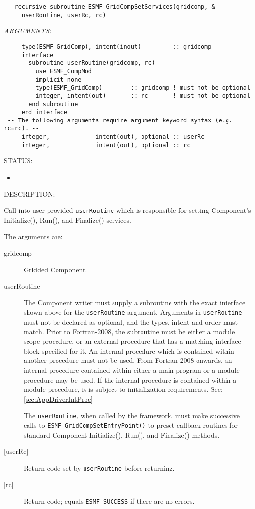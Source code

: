   
\begin{verbatim}   recursive subroutine ESMF_GridCompSetServices(gridcomp, &
     userRoutine, userRc, rc)\end{verbatim}{\em ARGUMENTS:}
\begin{verbatim}     type(ESMF_GridComp), intent(inout)         :: gridcomp
     interface
       subroutine userRoutine(gridcomp, rc)
         use ESMF_CompMod
         implicit none
         type(ESMF_GridComp)        :: gridcomp ! must not be optional
         integer, intent(out)       :: rc       ! must not be optional
       end subroutine
     end interface
 -- The following arguments require argument keyword syntax (e.g. rc=rc). --
     integer,             intent(out), optional :: userRc
     integer,             intent(out), optional :: rc\end{verbatim}
{\sf STATUS:}
   \begin{itemize}
   \item{}
   \end{itemize}
  
{\sf DESCRIPTION:\\ }


   \label{GridComp:SetServices}
   Call into user provided {\tt userRoutine} which is responsible for
   setting Component's Initialize(), Run(), and Finalize() services.
  
   The arguments are:
   \begin{description}
   \item[gridcomp]
     Gridded Component.
   \item[userRoutine]
     The Component writer must supply a subroutine with the exact interface
     shown above for the {\tt userRoutine} argument. Arguments in {\tt userRoutine}
     must not be declared as optional, and the types, intent and order must match.
     Prior to Fortran-2008, the subroutine must be either a module scope procedure,
     or an external procedure that has a matching interface block specified for it.
     An internal procedure which is contained within another procedure must not be used.
     From Fortran-2008 onwards, an internal procedure contained within either a main program
     or a module procedure may be used.  If the internal procedure is contained within a
     module procedure, it is subject to initialization requirements.  See: \ref{sec:AppDriverIntProc}
  
     \begin{sloppypar}
     The {\tt userRoutine}, when called by the framework, must make successive calls
     to {\tt ESMF\_GridCompSetEntryPoint()} to preset callback routines for
     standard Component Initialize(), Run(), and Finalize() methods.
     \end{sloppypar}
   \item[{[userRc]}]
     Return code set by {\tt userRoutine} before returning.
   \item[{[rc]}]
     Return code; equals {\tt ESMF\_SUCCESS} if there are no errors.
   \end{description}
  
